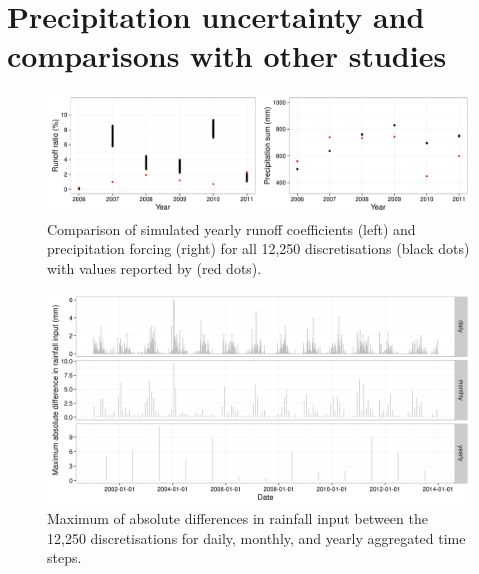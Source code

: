 \section{Precipitation uncertainty and comparisons with other studies}    %
\appendixfigures  %
\begin{figure}[h]
\includegraphics[width=\linewidth]{../analysis/comparison_results/Bengue_prec_rc_compare.pdf}
\caption{Comparison of simulated yearly runoff coefficients (left) and precipitation forcing (right) for all 12,250 discretisations (black dots) with values reported by \citet{Medeiros2014b} (red dots).}
\label{fig:prec_rc_compare}
\end{figure}
\begin{figure}[h]
\includegraphics[width=\linewidth]{../analysis/comparison_results/rainfall_maxabsdiff_experiments_overview.png}
\caption{Maximum of absolute differences in rainfall input between the 12,250 discretisations for daily, monthly, and yearly aggregated time steps.}
\label{fig:prec_diff}
\end{figure}







